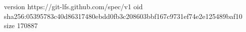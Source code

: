 version https://git-lfs.github.com/spec/v1
oid sha256:05395783c40d86317480ebdd0fb3c208603bbf167c9731ef74e2e125489baf10
size 170887
